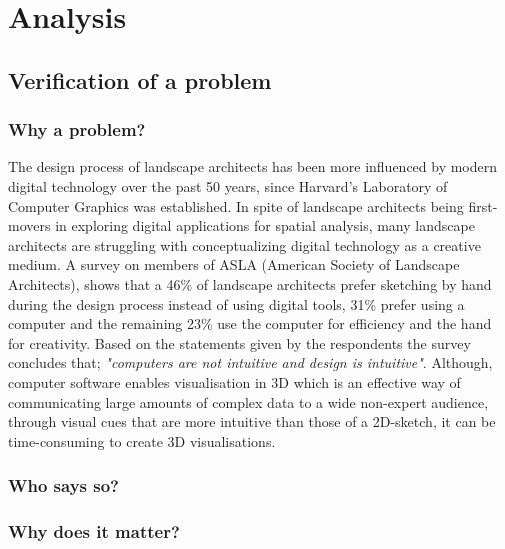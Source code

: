 \chapter{Analysis}
	
	
	\section{Verification of a problem}\label{sec:verification}
		
 		\subsection{Why a problem?}
 		The design process of landscape architects has been more influenced by modern digital technology over the past 50 years, since Harvard's Laboratory of Computer Graphics was established.\cite{landscapeArchitectureDigiTech} In spite of landscape architects being first-movers in exploring digital applications for spatial analysis, many landscape architects are struggling with conceptualizing digital technology as a creative medium\cite{landscapeArchitectureDigiTech}. A survey on members of ASLA (American Society of Landscape Architects)\cite{surveySketchVSDigital}, shows that a 46\% of landscape architects prefer sketching by hand during the design process instead of using digital tools, 31\% prefer using a computer and the remaining 23\% use the computer for efficiency and the hand for creativity. Based on the statements given by the respondents the survey concludes that; \textit{"computers are not intuitive and design is intuitive"}\cite{landscapeArchitectureDigiTech}\cite{surveySketchVSDigital}. Although, computer software enables visualisation in 3D which is an effective way of communicating large amounts of complex data to a wide non-expert audience, through visual cues that are more intuitive than those of a 2D-sketch, it can be time-consuming to create 3D visualisations.\cite{landscapeVisual}
 		

		\subsection{Who says so?}
		
		\subsection{Why does it matter?}
		
